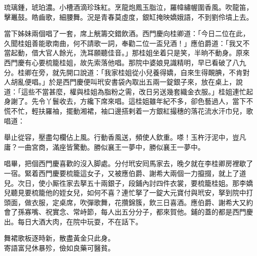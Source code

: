 \begin{myquote}
琉璃鍾，琥珀濃。小槽酒滴珍珠紅。烹龍炮鳳玉脂泣，羅幃繡幄圍香風。吹龍笛，擊鼉鼓。皓齒歌，細腰舞。況是青春莫虛度，銀缸掩映嬌娥語，不到劉伶墳上去。
\end{myquote}

當下姊妹兩個唱了一套，席上觥籌交錯飲酒。西門慶向桂卿道：「今日二位在此，久聞桂姐善能歌南曲，何不請歌一詞，奉勸二位一盃兒酒！」應伯爵道：「我又不當起動，借大官人餘光，洗耳願聽佳音。」那桂姐坐着只是笑，半晌不動身。原來西門慶有心要梳籠桂姐，故先索落他唱。那院中婆娘見識精明，早已看破了八九分。桂卿在旁，就先開口說道：「我家桂姐從小兒養得嬌，自來生得靦腆，不肯對人胡亂便唱。」於是西門慶便叫玳安書袋內取出五兩一錠銀子來，放在桌上，說道：「這些不當甚麼，權與桂姐為脂粉之需，改日另送幾套織金衣服。」桂姐連忙起身謝了。{}先令丫鬟收去，方纔下席來唱。這桂姐雖年紀不多，卻色藝過人，當下不慌不忙，輕扶羅袖，擺動湘裙，袖口邊搭剌着一方銀紅撮穗的落花流水汗巾兒，{}歌唱道：

\begin{myquote}
舉止從容，壓盡勾欄佔上風。行動香風送，頻使人欽重。嗏！玉杵汙泥中，豈凡庸？一曲宮商，滿座皆驚動。勝似襄王一夢中，勝似襄王一夢中。
\end{myquote}

唱畢，把個西門慶喜歡的沒入脚處。分付玳安囘馬家去，晚夕就在李桂卿房裡歇了一宿。緊着西門慶要梳籠這女子，又被應伯爵、謝希大兩個一力攛掇，就上了道兒。次日，使小厮徃家去拏五十兩銀子，段鋪內討四件衣裳，要梳籠桂姐。那李嬌兒聽見要梳籠他的姪女兒，{}如何不喜？連忙拏了一錠大元寶付與玳安，拏到院中打頭面，做衣服，定桌席，吹彈歌舞，花攢錦簇，飲三日喜酒。應伯爵、謝希大又約會了孫寡嘴、祝實念、常峙節，每人出五分分子，都來賀他。鋪的蓋的都是西門慶出。每日大酒大肉，在院中玩耍，不在話下。

\begin{myquote}
舞裙歌板逐時新，散盡黃金只此身。\\寄語富兒休暴殄，儉如良藥可醫貧。
\end{myquote}

